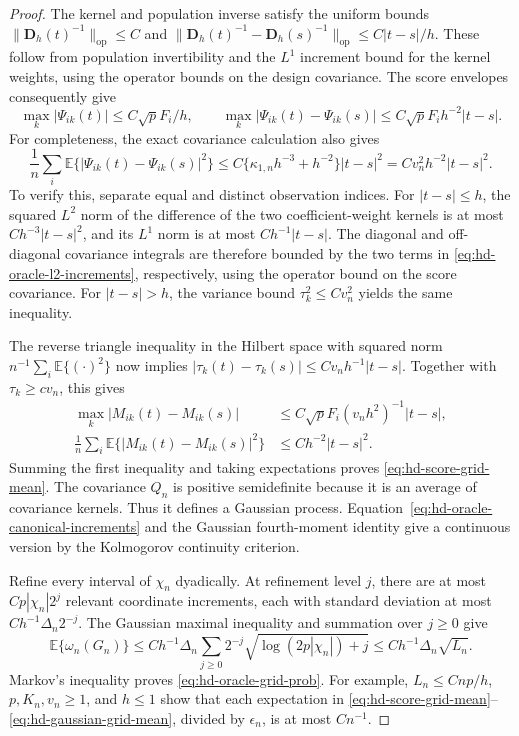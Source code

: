 \documentclass[10pt]{book}
\newcommand{\bD}{{\mathbf D}}
\newcommand{\expect}{\mathbb{E}}
\numberwithin{equation}{section}
\begin{document}
\begin{proof}
The kernel and population inverse satisfy the uniform bounds
$\|\bD_h(t)^{-1}\|_{\mathrm{op}}\le C$ and
$\|\bD_h(t)^{-1}-\bD_h(s)^{-1}\|_{\mathrm{op}}
 \le C|t-s|/h$.
These follow from population invertibility and the $L^1$ increment
bound for the kernel weights, using the operator bounds on the design
covariance. The score envelopes consequently give
\[
 \max_k|\Psi_{ik}(t)|\le C\sqrt pF_i/h,
 \qquad
 \max_k|\Psi_{ik}(t)-\Psi_{ik}(s)|
 \le C\sqrt pF_i h^{-2}|t-s|.
\]
For completeness, the exact covariance calculation also gives
\begin{equation}
 \frac1n\sum_i\expect\{|\Psi_{ik}(t)-\Psi_{ik}(s)|^2\}
 \le C\{\kappa_{1,n}h^{-3}+h^{-2}\}|t-s|^2
 =Cv_n^2h^{-2}|t-s|^2.
 \label{eq:hd-oracle-l2-increments}
\end{equation}
To verify this, separate equal and distinct observation indices. For
$|t-s|\le h$, the squared $L^2$ norm of the difference of the two
coefficient-weight kernels is at most $Ch^{-3}|t-s|^2$, and its
$L^1$ norm is at most $Ch^{-1}|t-s|$. The diagonal and off-diagonal
covariance integrals are therefore bounded by the two terms in
\eqref{eq:hd-oracle-l2-increments}, respectively, using the operator
bound on the score covariance. For $|t-s|>h$, the variance bound
$\tau_k^2\le Cv_n^2$ yields the same inequality.

The reverse triangle inequality in the Hilbert space with squared norm
$n^{-1}\sum_i\expect\{(\cdot)^2\}$ now implies
$|\tau_k(t)-\tau_k(s)|\le Cv_nh^{-1}|t-s|$.
Together with $\tau_k\ge cv_n$, this gives
\begin{align}
 \max_k|M_{ik}(t)-M_{ik}(s)|
 &\le C\sqrt pF_i(v_nh^2)^{-1}|t-s|,
 \label{eq:hd-oracle-path-increments}\\
 \frac1n\sum_i\expect\{|M_{ik}(t)-M_{ik}(s)|^2\}
 &\le Ch^{-2}|t-s|^2.
 \label{eq:hd-oracle-canonical-increments}
\end{align}
Summing the first inequality and taking expectations proves
\eqref{eq:hd-score-grid-mean}. The covariance $Q_n$ is positive
semidefinite because it is an average of covariance kernels. Thus it
defines a Gaussian process. Equation~\eqref{eq:hd-oracle-canonical-increments}
and the Gaussian fourth-moment identity give a continuous version by
the Kolmogorov continuity criterion.

Refine every interval of $\chi_n$ dyadically. At refinement level $j$,
there are at most $Cp|\chi_n|2^j$ relevant coordinate increments, each
with standard deviation at most $Ch^{-1}\Delta_n2^{-j}$.
The Gaussian maximal inequality and summation over $j\ge0$ give
\[
 \expect\{\omega_n(G_n)\}
 \le Ch^{-1}\Delta_n\sum_{j\ge0}2^{-j}
       \sqrt{\log(2p|\chi_n|)+j}
 \le Ch^{-1}\Delta_n\sqrt{L_n}.
\]
Markov's inequality proves \eqref{eq:hd-oracle-grid-prob}.
For example, $L_n\le Cnp/h$, $p,K_n,v_n\ge1$, and $h\le1$ show
that each expectation in
\eqref{eq:hd-score-grid-mean}--\eqref{eq:hd-gaussian-grid-mean},
divided by $\epsilon_n$, is at most $Cn^{-1}$.
\end{proof}
\end{document}
